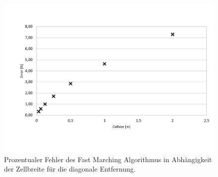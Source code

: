 \begin{figure}[ht]
	\centering
  \includegraphics[width=\textwidth]{abbildungen/vergleich_euklid_fast_marching/EuklidFastMarchingError.pdf}
	\caption{Prozentualer Fehler des Fast Marching Algorithmus in Abhängigkeit der Zellbreite für die diagonale Entfernung.}
	\label{fig_fast_marching_error_cellsize}
\end{figure}


